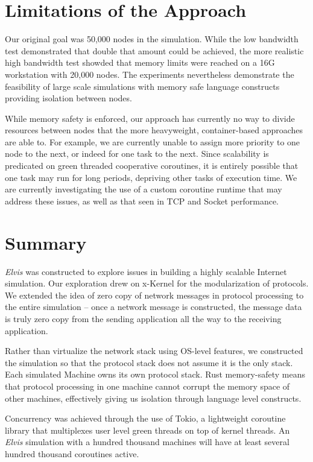 \documentclass[journal]{IEEEtran} %
\newcommand{\elvis}{\textit{Elvis}}
\begin{document}
\section{Limitations of the Approach}
Our original goal was 50,000 nodes in the simulation. While the low bandwidth test demonstrated
that double that amount could be achieved, the more realistic high bandwidth test 
showded that memory limits were reached on a 16G workstation with 20,000 nodes.
The experiments nevertheless demonstrate the feasibility of large scale simulations
with memory safe language constructs providing isolation between nodes.

While memory safety is enforced, our approach has currently no way to divide resources
between nodes that the more heavyweight, container-based approaches are able to. 
For example, we are currently unable to assign more priority to
one node to the next, or indeed for one task to the next. 
Since scalability is predicated on green threaded cooperative coroutines, 
it is entirely possible that one task may run for long periods, depriving other
tasks of execution time. We are currently investigating the use of
a custom coroutine runtime that may address these issues, as well as
that seen in TCP and Socket performance.

\section{Summary}
\elvis{} was constructed to explore issues in building a highly scalable Internet simulation. Our exploration drew on x-Kernel\cite{xk} for the modularization of protocols. We extended the idea of zero copy of network messages in protocol processing to the entire simulation – once a network message is constructed, the message data is truly zero copy from the sending application all the way to the receiving application.

Rather than virtualize the network stack using OS-level features, we constructed the simulation so that the protocol stack does not assume it is the only stack. Each simulated Machine owns its own protocol stack. Rust memory-safety means that protocol processing in one machine cannot corrupt the memory space of other machines, effectively giving us isolation through language level constructs.

Concurrency was achieved through the use of Tokio, a lightweight coroutine library that multiplexes user level green threads on top of kernel threads. An \elvis{} simulation with a hundred thousand machines will have at least several hundred thousand coroutines active.
\end{document}
